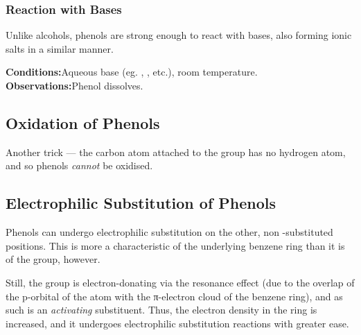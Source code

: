 
			\pagebreak
			\subsubsection{Reaction with Bases}

				Unlike alcohols, phenols are strong enough to react with bases, also forming ionic salts in a similar manner.


				\vspace{1.5em}
				\vbox{\textbf{Conditions:}\tabto{35mm}Aqueous base (eg. , , etc.), room temperature.}
				\vbox{\textbf{Observations:}\tabto{35mm}Phenol dissolves.}






		\subsection{Oxidation of Phenols}

			Another trick --- the carbon atom attached to the  group has no hydrogen atom, and so phenols \textit{cannot} be
			oxidised.



		\subsection{Electrophilic Substitution of Phenols}

			Phenols can undergo electrophilic substitution on the other, non -substituted positions. This is more a characteristic
			of the underlying benzene ring than it is of the  group, however.

			Still, the  group is electron-donating via the resonance effect (due to the overlap of the p-orbital of the  atom
			with the π-electron cloud of the benzene ring), and as such is an \textit{activating} substituent. Thus, the electron density
			in the ring is increased, and it undergoes electrophilic substitution reactions with greater ease.

